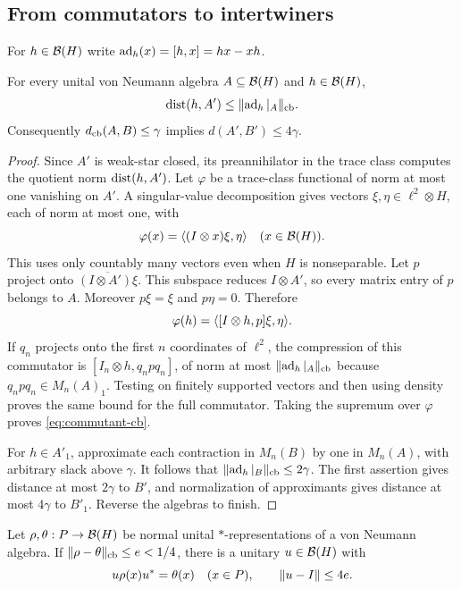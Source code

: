 \subsection{From commutators to intertwiners}

For $h\in\mathcal B(H)$ write $\operatorname{ad}_h(x)=[h,x]=hx-xh$.

\begin{lemma}\label{lem:commutant-cb}
For every unital von Neumann algebra $A\subseteq\mathcal B(H)$ and
$h\in\mathcal B(H)$,
\begin{equation}\label{eq:commutant-cb}
 \operatorname{dist}(h,A')\le\lVert\operatorname{ad}_h|_A\rVert_{\mathrm{cb}}.
\end{equation}
Consequently $d_{\mathrm{cb}}(A,B)\le\gamma$ implies $d(A',B')\le4\gamma$.
\end{lemma}

\begin{proof}
Since $A'$ is weak-star closed, its preannihilator in the trace class
computes the quotient norm $\operatorname{dist}(h,A')$. Let $\varphi$ be a trace-class
functional of norm at most one vanishing on $A'$. A singular-value
decomposition gives vectors $\xi,\eta\in\ell^2\otimes H$, each of
norm at most one, with
\[
 \varphi(x)=\langle (I\otimes x)\xi,\eta\rangle\quad(x\in\mathcal B(H)).
\]
This uses only countably many vectors even when $H$ is nonseparable.
Let $p$ project onto $\overline{(I\otimes A')\xi}$. This subspace
reduces $I\otimes A'$, so every matrix entry of $p$ belongs to $A$.
Moreover $p\xi=\xi$ and $p\eta=0$. Therefore
\[
 \varphi(h)=\langle [I\otimes h,p]\xi,\eta\rangle.
\]
If $q_n$ projects onto the first $n$ coordinates of $\ell^2$, the
compression of this commutator is
$[I_n\otimes h,q_npq_n]$, of norm at most
$\lVert\operatorname{ad}_h|_A\rVert_{\mathrm{cb}}$ because $q_npq_n\in M_n(A)_1$.
Testing on finitely supported vectors and then using density proves
the same bound for the full commutator. Taking the supremum over
$\varphi$ proves \eqref{eq:commutant-cb}.

For $h\in A'_1$, approximate each contraction in $M_n(B)$ by one in
$M_n(A)$, with arbitrary slack above $\gamma$. It follows that
$\lVert\operatorname{ad}_h|_B\rVert_{\mathrm{cb}}\le2\gamma$.
The first assertion gives distance at most $2\gamma$ to $B'$, and
normalization of approximants gives distance at most $4\gamma$ to
$B'_1$. Reverse the algebras to finish.
\end{proof}

\begin{lemma}\label{lem:paired}
Let $\rho,\theta:P\to\mathcal B(H)$ be normal unital $*$-representations of a
von Neumann algebra. If $\lVert\rho-\theta\rVert_{\mathrm{cb}}\le e<1/4$, there
is a unitary $u\in\mathcal B(H)$ with
\[
 u\rho(x)u^*=\theta(x)\quad(x\in P),\qquad \lVert u-I\rVert\le4e.
\]
\end{lemma}

